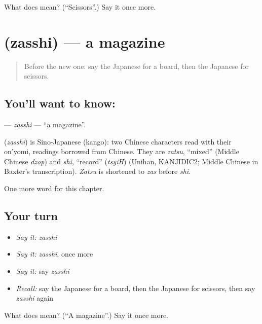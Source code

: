 \begin{tcolorbox}[breakable,colback=teal!4,colframe=teal!35!black,title={Before you move on}]
What does  mean? (\textquotedblleft{}Scissors\textquotedblright{}.) Say it once more.
\end{tcolorbox}
\section[\texorpdfstring{\ja{ざっし} (zasshi)}{ざっし (zasshi)}]{ (zasshi) — a magazine}

\label{lesson:JA-C100-zasshi}



\begin{quote}
Before the new one: say the Japanese for a board, then the Japanese for scissors.
\end{quote}

\subsection*{You'll want to know: }
\textbf{} — \emph{zasshi} — \textquotedblleft{}a magazine\textquotedblright{}.

\begin{cousinweb}
\textbf{} (\emph{zasshi}) is Sino-Japanese (kango): two Chinese characters read with their on'yomi, readings borrowed from Chinese. They are \emph{zatsu}, \textquotedblleft{}mixed\textquotedblright{} (Middle Chinese \emph{dzop}) and \emph{shi}, \textquotedblleft{}record\textquotedblright{} (\emph{tsyiH}) (Unihan, KANJIDIC2; Middle Chinese in Baxter's transcription). \emph{Zatsu} is shortened to \emph{zas} before \emph{shi}.
\end{cousinweb}

\begin{grammarlens}[title={What you've built}]
One more word for this chapter.
\end{grammarlens}

\subsection*{Your turn}
\begin{itemize}
\raggedright
  \item \emph{Say it:} \emph{zasshi}
  \item \emph{Say it:} \emph{zasshi}, once more
  \item \emph{Say it:} say \emph{zasshi}
  \item \emph{Recall:} say the Japanese for a board, then the Japanese for scissors, then say \emph{zasshi} again
\end{itemize}

\begin{tcolorbox}[breakable,colback=teal!4,colframe=teal!35!black,title={Before you move on}]
What does  mean? (\textquotedblleft{}A magazine\textquotedblright{}.) Say it once more.
\end{tcolorbox}
